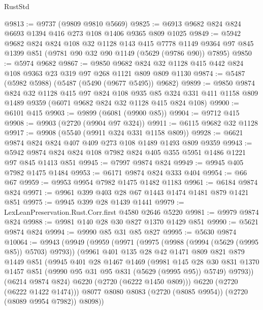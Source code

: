 \begin{lexlean}{RustStd}
\begin{coremodule}
@9813 := @9737 (@9809 @9810 @5669)
@9825 := @6913 @9682 @824 @824 @6693 @1394 @416 @273 @108 @1406 @9365 @809 @1025
@9849 := @5942
    @9682
    @824
    @824
    @108
    @32
    @1128
    @143
    @415
    @7778
    @1149
    @9364
    @97
    @845
    @1399
    @851
    (@9781 @90 @32 @90 @1149 (@5629 (@9786 @90)) @7895)
@9850 := @5974 @9682
@9867 := @9850
    @9682
    @824
    @32
    @1128
    @415
    @442
    @824
    @108
    @9363
    @23
    @319
    @97
    @268
    @1121
    @809
    @809
    @1130
@9874 := @5487 (@5982 @5988) (@5487 (@5490 (@9677 @5495)) @9682)
@9899 := @9850
    @9874
    @824
    @32
    @1128
    @415
    @97
    @824
    @108
    @935
    @85
    @324
    @331
    @411
    @1158
    @809
    @1489
    @9359
    (@6071 @9682 @824 @32 @1128 @415 @824 @108)
@9900 := @6101 @415
@9903 := @9899 (@6081 (@9900 @85))
@9904 := @9712 @415
@9908 := @9903 (@2720 (@9904 @97 @324))
@9911 := @6115 @9682 @32 @1128
@9917 := @9908 (@5540 (@9911 @324 @331 @1158 @809))
@9928 := @6621 @9874 @824 @824 @407 @409 @273 @108 @1489 @1493 @809 @9359
@9943 := @5942 @9874 @824 @824 @108 @7982 @824 @405 @355 @5951 @1486 @1221 @97 @845 @1413 @851
@9945 := @7997 @9874 @824
@9949 := @9945 @405 @7982 @1475 @1484
@9953 := @6171 @9874 @824 @333 @404
@9954 := @66 @67
@9959 := @9953 @9954 @7982 @1475 @1482 @1183
@9961 := @6184 @9874 @824
@9971 := @9961 @399 @403 @28 @67 @1443 @1474 @1481 @879 @1421 @851
@9975 := @9945 @399 @28 @1439 @1441
@9979 := LexLeanPreservation.Rust.Corr.first @4580 @2646 @5220
@9981 := @9979 @9874 @824
@9988 := @9981 @140 @28 @30 @827 @1370 @1429 @851
@9990 := @5621 @9874 @824
@9994 := @9990 @85 @31 @85 @827
@9995 := @5630 @9874
@10064 := @9943
    (@9949
      (@9959
        (@9971
          (@9975 (@9988 (@9994 (@5629 (@9995 @85)) @5703) @9793))
          (@9961
            @401
            @135
            @28
            @42
            @1471
            @809
            @821
            @879
            @1449
            @851
            (@9945
              @401
              @28
              @1467
              @1469
              (@9981
                @145
                @28
                @30
                @831
                @1370
                @1457
                @851
                (@9990 @95 @31 @95 @831 (@5629 (@9995 @95)) @5749)
                @9793))
            (@6214 @9874 @824)
            @6220
            (@2720 (@6222 @1450 @809)))
          @6220
          (@2720 (@6222 @1422 @1474)))
        @8077
        @8080
        @8083
        (@2720 (@8085 @9954))
        (@2720 (@8089 @9954 @7982))
        @8098))

\end{coremodule}
\end{lexlean}
